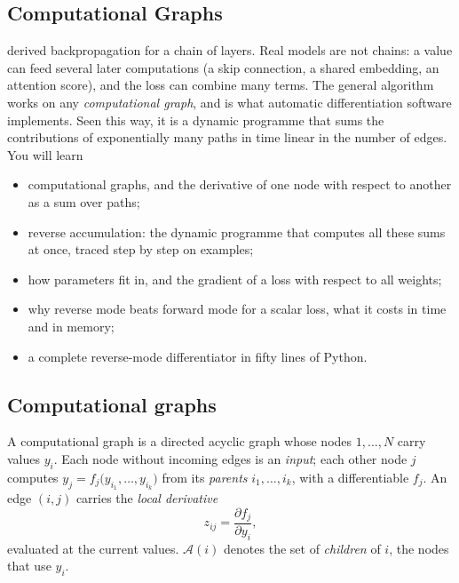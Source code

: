 \begin{notechapter}
\chapter{Computational Graphs}\label{ch:computational-graphs}

\begin{chapterintro}
 derived backpropagation for a chain of layers. Real models are not
chains: a value can feed several later computations (a skip connection, a shared
embedding, an attention score), and the loss can combine many terms. The general
algorithm works on any \emph{computational graph}, and is what automatic differentiation
software implements. Seen this way, it is a dynamic programme that sums the contributions
of exponentially many paths in time linear in the number of edges. You will learn
\begin{itemize}[nosep]
  \item computational graphs, and the derivative of one node with respect to another as a
        sum over paths;
  \item reverse accumulation: the dynamic programme that computes all these sums at once,
        traced step by step on examples;
  \item how parameters fit in, and the gradient of a loss with respect to all weights;
  \item why reverse mode beats forward mode for a scalar loss, what it costs in time and in
        memory;
  \item a complete reverse-mode differentiator in fifty lines of Python.
\end{itemize}
\end{chapterintro}

\section{Computational graphs}\label{computational-graphs:sec:graphs}

\begin{definition}\label{computational-graphs:def:graph}
A computational graph is a directed acyclic graph whose nodes $1,\dots,N$ carry values $y_i$. Each
node without incoming edges is an \emph{input}; each other node $j$ computes
$y_j = f_j\bigl(y_{i_1},\dots,y_{i_k}\bigr)$ from its \emph{parents} $i_1,\dots,i_k$, with a differentiable $f_j$. An edge $(i,j)$ carries the
\emph{local derivative}
\[
  z_{ij} = \frac{\partial f_j}{\partial y_i},
\]
evaluated at the current values. $\mathcal A(i)$ denotes the set of \emph{children} of $i$, the nodes that use $y_i$.
\end{definition}


\end{notechapter}
